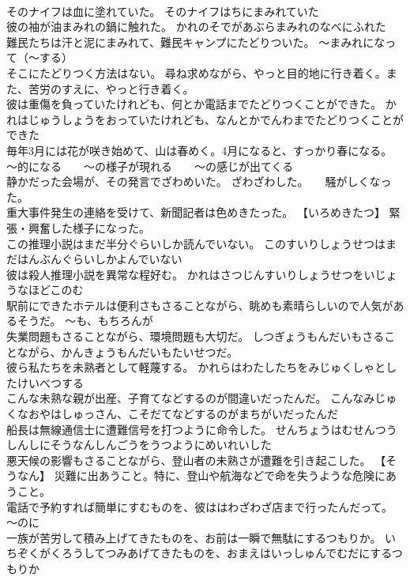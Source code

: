 \documentclass[8pt]{extreport}
\begin{document}
\begin{CJK}{UTF8}{min}
\\	そのナイフは血に塗れていた。	そのナイフはちにまみれていた 
\\	彼の袖が油まみれの鍋に触れた。	かれのそでがあぶらまみれのなべにふれた 
\\	難民たちは汗と泥にまみれて、難民キャンプにたどりついた。	～まみれになって（～する）
\\	そこにたどりつく方法はない。	尋ね求めながら、やっと目的地に行き着く。また、苦労のすえに、やっと行き着く。
\\	彼は重傷を負っていたけれども、何とか電話までたどりつくことができた。	かれはじゅうしょうをおっていたけれども、なんとかでんわまでたどりつくことができた 
\\	毎年3月には花が咲き始めて、山は春めく。4月になると、すっかり春になる。	～的になる　　～の様子が現れる　　～の感じが出てくる
\\	静かだった会場が、その発言でざわめいた。	ざわざわした。　　騒がしくなった。
\\	重大事件発生の連絡を受けて、新聞記者は色めきたった。	【いろめきたつ】 緊張・興奮した様子になった。
\\	この推理小説はまだ半分ぐらいしか読んでいない。	このすいりしょうせつはまだはんぶんぐらいしかよんでいない 
\\	彼は殺人推理小説を異常な程好む。	かれはさつじんすいりしょうせつをいじょうなほどこのむ 
\\	駅前にできたホテルは便利さもさることながら、眺めも素晴らしいので人気があるそうだ。	～も、もちろんが
\\	失業問題もさることながら、環境問題も大切だ。	しつぎょうもんだいもさることながら、かんきょうもんだいもたいせつだ。 
\\	彼ら私たちを未熟者として軽蔑する。	かれらはわたしたちをみじゅくしゃとしたけいべつする 
\\	こんな未熟な親が出産、子育てなどするのが間違いだったんだ。	こんなみじゅくなおやはしゅっさん、こそだてなどするのがまちがいだったんだ 
\\	船長は無線通信士に遭難信号を打つように命令した。	せんちょうはむせんつうしんしにそうなんしんごうをうつようにめいれいした 
\\	悪天候の影響もさることながら、登山者の未熟さが遭難を引き起こした。	【そうなん】 災難に出あうこと。特に、登山や航海などで命を失うような危険にあうこと。
\\	電話で予約すれば簡単にすむものを、彼ははわざわざ店まで行ったんだって。	～のに
\\	一族が苦労して積み上げてきたものを、お前は一瞬で無駄にするつもりか。	いちぞくがくろうしてつみあげてきたものを、おまえはいっしゅんでむだにするつもりか 

\end{CJK}
\end{document}
